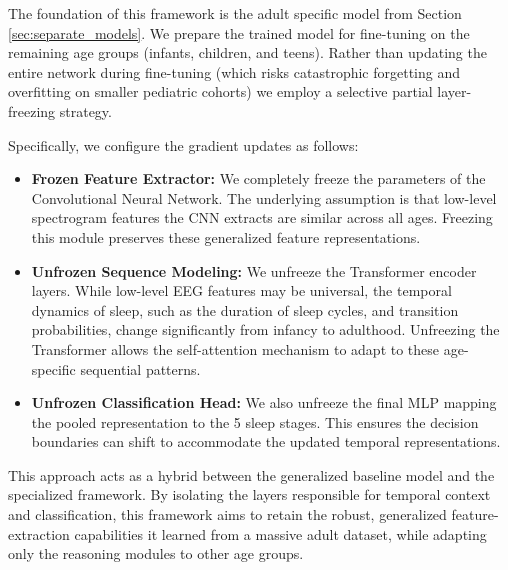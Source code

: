 The foundation of this framework is the adult specific model from 
Section \ref{sec:separate_models}.
We prepare the trained model for fine-tuning on the remaining age groups (infants, children, and teens). Rather than updating the entire network during fine-tuning (which risks catastrophic forgetting and overfitting on smaller pediatric cohorts) we employ a selective partial layer-freezing strategy. 

Specifically, we configure the gradient updates as follows:
\begin{itemize}
    \item \textbf{Frozen Feature Extractor:} We completely freeze the parameters of the Convolutional Neural Network. The underlying assumption is that low-level spectrogram features the CNN extracts are similar across all ages. Freezing this module preserves these generalized feature representations.
    \item \textbf{Unfrozen Sequence Modeling:} We unfreeze the Transformer encoder layers. While low-level EEG features may be universal, the temporal dynamics of sleep, such as the duration of sleep cycles, and transition probabilities, change significantly from infancy to adulthood. Unfreezing the Transformer allows the self-attention mechanism to adapt to these age-specific sequential patterns.
    \item \textbf{Unfrozen Classification Head:} We also unfreeze the final MLP mapping the pooled representation to the 5 sleep stages. This ensures the decision boundaries can shift to accommodate the updated temporal representations.
\end{itemize}

This approach acts as a hybrid between the generalized baseline model and the specialized framework. By isolating the layers responsible for temporal context and classification, this framework aims to retain the robust, generalized feature-extraction capabilities it learned from a massive adult dataset, while adapting only the reasoning modules to other age groups.